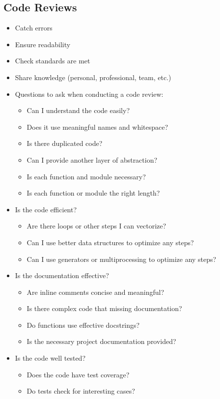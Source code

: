 \subsection{Code Reviews}
\begin{itemize}
	\item Catch errors
	\item Ensure readability
	\item Check standards are met
	\item Share knowledge (personal, professional, team, etc.)
	\item Questions to ask when conducting a code review:
	\begin{itemize}
		\item Can I understand the code easily?
		\item Does it use meaningful names and whitespace?
		\item Is there duplicated code?
		\item Can I provide another layer of abstraction?
		\item Is each function and module necessary?
		\item Is each function or module the right length?
	\end{itemize}
	\item Is the code efficient?
	\begin{itemize}
		\item Are there loops or other steps I can vectorize?
		\item Can I use better data structures to optimize any steps?
		\item Can I use generators or multiprocessing to optimize any steps?
	\end{itemize}
	\item Is the documentation effective?
	\begin{itemize}
		\item Are inline comments concise and meaningful?
		\item Is there complex code that missing documentation?
		\item Do functions use effective docstrings?
		\item Is the necessary project documentation provided?
	\end{itemize}
	\item Is the code well tested?
	\begin{itemize}
		\item Does the code have test coverage?
		\item Do tests check for interesting cases?

\end{itemize}
\end{itemize}
